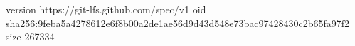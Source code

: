 version https://git-lfs.github.com/spec/v1
oid sha256:9feba5a4278612e6f8b00a2de1ae56d9d43d548e73bac97428430c2b65fa97f2
size 267334
